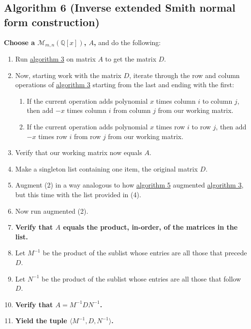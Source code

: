 \documentclass[twocolumn]{article}
\begin{document}
		\subsection{Algorithm 6 (Inverse extended Smith normal form construction)}\label{sec:algorithm 6}
			\textbf{Choose a $\mathcal{M}_{m,n}(\mathbb{Q}[x])$, $A$,} and do the following:
			\begin{enumerate}
				\item Run \hyperref[sec:algorithm 3]{algorithm 3} on matrix $A$ to get the matrix $D$.
				\item Now, starting work with the matrix $D$, iterate through the row and column operations of \hyperref[sec:algorithm 3]{algorithm 3} starting from the last and ending with the first:
					\begin{enumerate}
						\item If the current operation adds polynomial $x$ times column $i$ to column $j$, then add $-x$ times column $i$ from column $j$ from our working matrix.
						\item If the current operation adds polynomial $x$ times row $i$ to row $j$, then add $-x$ times row $i$ from row $j$ from our working matrix.
					\end{enumerate}
				\item Verify that our working matrix now equals $A$.
				\item Make a singleton list containing one item, the original matrix $D$.
				\item Augment (2) in a way analogous to how \hyperref[sec:algorithm 5]{algorithm 5} augmented \hyperref[sec:algorithm 3]{algorithm 3}, but this time with the list provided in (4).
				\item Now run augmented (2).
				\item \textbf{Verify that $A$ equals the product, in-order, of the matrices in the list.}
				\item Let $M^{-1}$ be the product of the sublist whose entries are all those that precede $D$.
				\item Let $N^{-1}$ be the product of the sublist whose entries are all those that follow $D$.
				\item \textbf{Verify that $A=M^{-1}DN^{-1}$.}
				\item \textbf{Yield the tuple $\langle M^{-1}, D, N^{-1}\rangle$.}
			\end{enumerate}
\end{document}

